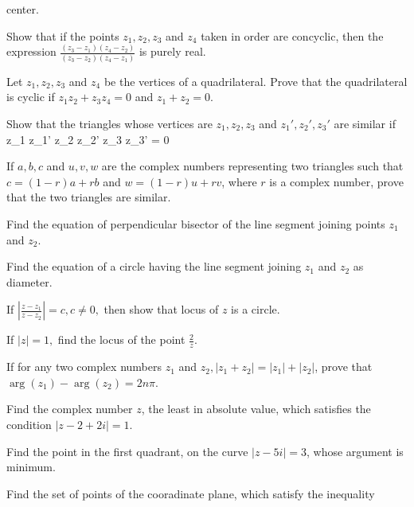   center.
\item Show that if the points $z_1, z_2, z_3$ and $z_4$ taken in order are concyclic, then the expression $\frac{(z_3 - z_1)(z_4 -
  z_2)}{(z_3 - z_2)(z_4 - z_1)}$ is purely real.
\item Let $z_1, z_2, z_3$ and $z_4$ be the vertices of a quadrilateral. Prove that the quadrilateral is cyclic if $z_1z_2 + z_3z_4
  = 0$ and $z_1 + z_2 =0$.
\item Show that the triangles whose vertices are $z_1, z_2, z_3$ and $z_1', z_2', z_3'$ are similar if \startformula \startdeterminant
  \NC z_1 \NC z_1' \NR\NC z_2 \NC z_2' \NR\NC z_3 \NC z_3' \NR\stopdeterminant = 0\stopformula
\item If $a, b, c$ and $u, v, w$ are the complex numbers representing two triangles such that $c = (1 - r)a
  + rb$ and $w = (1 - r)u
  + rv$, where $r$ is a complex number, prove that the two triangles are similar.
\item Find the equation of perpendicular bisector of the line segment joining points $z_1$ and $z_2$.
\item Find the equation of a circle having the line segment joining $z_1$ and $z_2$ as diameter.
\item If $\left|\frac{z - z_1}{z - z_2}\right| = c, c\neq 0,$ then show that locus of $z$ is a circle.
\item If $|z| = 1,$ find the locus of the point $\frac{2}{z}$.
\item If for any two complex numbers $z_1$ and $z_2, |z_1 + z_2| = |z_1| + |z_2|$, prove that $\arg(z_1) - \arg(z_2) = 2n\pi$.
\item Find the complex number $z$, the least in absolute value, which satisfies the condition $|z - 2 + 2i| = 1$.
\item Find the point in the first quadrant, on the curve $|z - 5i| = 3$, whose argument is minimum.
\item Find the set of points of the cooradinate plane, which satisfy the inequality

